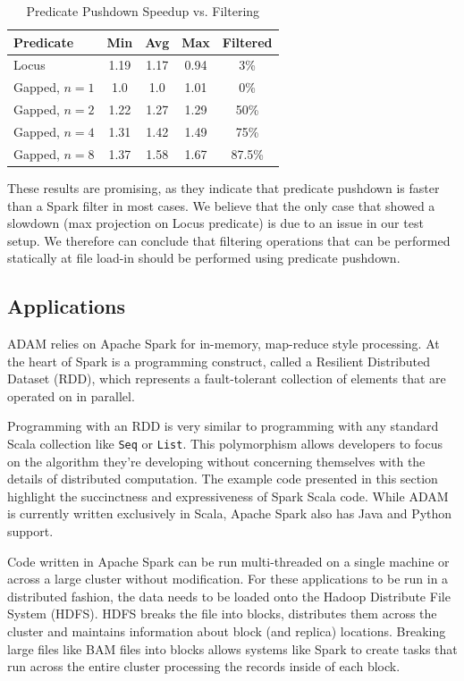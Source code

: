 \documentclass[10pt,twocolumn]{article}
\theoremstyle{plain}
\begin{document}
\begin{table}[h]
\caption{Predicate Pushdown Speedup vs. Filtering}
\label{tab:filter-vs-predicate}
\begin{center}
\begin{tabular}{| l | c  c c | c |}
\hline
\bf Predicate & \bf Min & \bf Avg & \bf Max & \bf Filtered \\
\hline
Locus & 1.19 & 1.17 & 0.94 & 3\% \\
Gapped, $n = 1$ & 1.0 & 1.0 & 1.01 & 0\% \\
Gapped, $n = 2$ & 1.22 & 1.27 & 1.29 & 50\% \\
Gapped, $n = 4$ & 1.31 & 1.42 & 1.49 & 75\% \\
Gapped, $n = 8$ & 1.37 & 1.58 & 1.67 & 87.5\% \\
\hline
\end{tabular}
\end{center}
\end{table}

These results are promising, as they indicate that predicate pushdown is faster than a Spark filter in most cases. We believe that the
only case that showed a slowdown (max projection on Locus predicate) is due to an issue in our test setup. We therefore can conclude
that filtering operations that can be performed statically at file load-in should be performed using predicate pushdown.

\subsection{Applications}
\label{sec:applications}

ADAM relies on Apache Spark for in-memory, map-reduce style processing. At the heart of Spark is a programming construct,
called a Resilient Distributed Dataset (RDD), which represents a fault-tolerant collection of elements that are
operated on in parallel. 

Programming with an RDD is very similar to programming with any standard Scala collection
like \texttt{Seq} or \texttt{List}. This polymorphism allows developers to focus on the algorithm they're developing 
without concerning themselves with the details of distributed computation. The example code presented in this section
highlight the succinctness and expressiveness of Spark Scala code. While ADAM is currently written exclusively in 
Scala, Apache Spark also has Java and Python support.

Code written in Apache Spark can be run multi-threaded on a single machine or across a large cluster without modification.
For these applications to be run in a distributed fashion, the data needs to be loaded onto the Hadoop
Distribute File System (HDFS). HDFS breaks the file into blocks, distributes them across the cluster and maintains
information about block (and replica) locations. Breaking large files like BAM files into blocks allows systems
like Spark to create tasks that run across the entire cluster processing the records inside of each block. 
\end{document}
